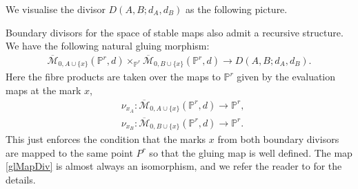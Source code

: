 We visualise the divisor $D(A,B;d_{A}, d_{B})$ as the following picture.
\begin{center}
    \end{center}

\begin{remark}
    Boundary divisors for the space of stable maps also admit a recursive structure.
    We have the following natural gluing morphism:
    \begin{align}
        \overline{\mathcal{M}}_{0,A\cup\{x\}}(\mathbb{P}^{r},d) \times_{\mathbb{P}^{r}}\overline{\mathcal{M}}_{0,B\cup\{x\}} (\mathbb{P}^{r},d) \to D(A,B;d_{A},d_{B}). \label{glMapDiv}
    \end{align}
    Here the fibre products are taken over the maps to $\mathbb{P}^{r}$ given by the evaluation maps at the mark $x$, 
    \begin{align*}
        &\nu_{x_A}:\overline{\mathcal{M}}_{0,A\cup\{x\}}(\mathbb{P}^{r},d) \to \mathbb{P}^{r},\\
        &\nu_{x_B}:\overline{\mathcal{M}}_{0,B\cup\{x\}}(\mathbb{P}^{r},d) \to \mathbb{P}^{r}.
    \end{align*}
    This just enforces the condition that the marks $x$ from both boundary divisors are mapped to the same point $P^{r}$ so that the gluing map is well defined. 
    The map \ref{glMapDiv} is almost always an isomorphism, and we refer the reader to \cite{FPnotes} for the details.
\end{remark}

